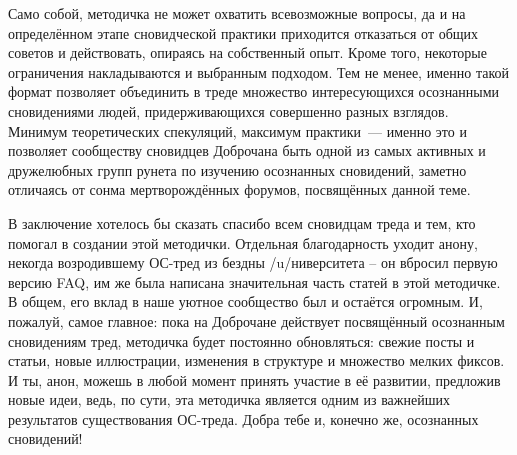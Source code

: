 \documentclass[a4paper,14pt,oneside]{memoir}
\begin{document}
Само собой, методичка не может охватить всевозможные вопросы, да и на определённом этапе сновидческой практики приходится отказаться от общих советов и действовать, опираясь на собственный опыт. Кроме того, некоторые ограничения накладываются и выбранным подходом. Тем не менее, именно такой формат позволяет объединить в треде множество интересующихся осознанными сновидениями людей, придерживающихся совершенно разных взглядов. Минимум теоретических спекуляций, максимум практики~--- именно это и позволяет сообществу сновидцев Доброчана быть одной из самых активных и дружелюбных групп рунета по изучению осознанных сновидений, заметно отличаясь от сонма мертворождённых форумов,  посвящённых данной теме.


В заключение хотелось бы сказать спасибо всем сновидцам треда и тем, кто помогал в создании этой методички. Отдельная благодарность уходит анону, некогда возродившему ОС-тред из бездны /u/ни\-вер\-си\-те\-та – он вбросил первую версию FAQ, им же была написана значительная часть статей в этой методичке. В общем, его вклад в наше уютное сообщество был и остаётся огромным. И, пожалуй, самое главное: пока на Доброчане действует посвящённый осознанным сновидениям тред, методичка будет постоянно обновляться: свежие посты и статьи, новые иллюстрации, изменения в структуре и множество мелких фиксов. И ты, анон, можешь в любой момент принять участие в её развитии, предложив новые идеи, ведь, по сути, эта методичка является одним из важнейших результатов существования ОС-треда. Добра тебе и, конечно же, осознанных сновидений!

\thispagestyle{conf}
\end{document}
